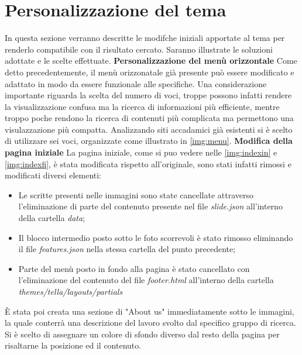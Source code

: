 \documentclass[target=bach,aauheader=]{thud}
\begin{document}
\section{Personalizzazione del tema}
In questa sezione verranno descritte le modifche iniziali apportate al tema per renderlo compatibile con il risultato cercato. Saranno illustrate le soluzioni adottate e le scelte effettuate. 
\newline \newline
\textbf{{\fontsize{12}{14}\selectfont Personalizzazione del menù orizzontale}}
\newline \newline
Come detto precedentemente, il menù orizzonatale già presente può essere modificato e adattato in modo da essere funzionale alle specifiche. 
Una considerazione importante riguarda la scelta del numero di voci, troppe possono infatti rendere la visualizzazione confusa ma la ricerca di informazioni più efficiente, mentre troppo poche rendono la ricerca di contenuti più complicata ma permettono una visulazzazione più compatta. 
Analizzando siti accadamici già esistenti si è scelto di utilizzare sei voci, organizzate come illustrato in \cref{img:menu}.
\newline \newline
\textbf{{\fontsize{12}{14}\selectfont Modifica della pagina iniziale}}
\newline \newline
La pagina iniziale, come si puo vedere nelle \cref{img:indexin} e \cref{img:indexfi}, è stata modificata rispetto all'originale, sono stati infatti rimossi e modificati diversi elementi: 
\begin{itemize}
    \item Le scritte presenti nelle immagini sono state cancellate attraverso l'eliminazione di parte del contenuto presente nel file \textit{slide.json} all'interno della cartella \textit{data};
    \item Il blocco intermedio posto sotto le foto scorrevoli è stato rimosso eliminando il file \textit{features.json} nella stessa cartella del punto precedente; 
    \item Parte del menù posto in fondo alla pagina è stato cancellato con l'eliminazione del contenuto del file \textit{footer.html} all'interno della cartella \textit{themes/tella/layouts/partials}
\end{itemize}
È stata poi creata una sezione di "About us" immediatamente sotto le immagini, la quale conterrà una descrizione del lavoro svolto dal specifico gruppo di ricerca. Si è scelto di assegnare un colore di sfondo diverso dal resto della pagina per risaltarne la posizione ed il contenuto.
\end{document}
